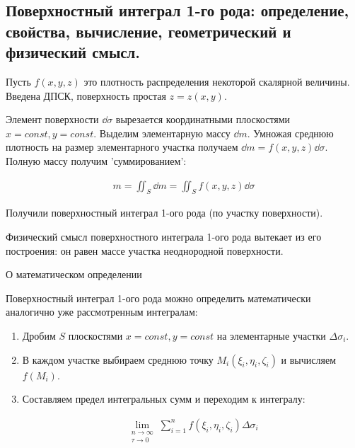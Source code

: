 \subsection{%
  Поверхностный интеграл 1-го рода: определение, свойства, вычисление,
  геометрический и физический смысл.%
}

\begin{twocolumns}
  
  \columnbreak

  Пусть \(f(x, y, z)\) это плотность распределения некоторой скалярной величины.
  Введена ДПСК, поверхность простая \(z = z(x, y)\).

  Элемент поверхности \(\dd \sigma\) вырезается координатными плоскостями
  \(x = const, y = const\). Выделим элементарную массу \(\dd  m\). Умножая
  среднюю плотность на размер элементарного участка получаем
  \(\dd m = f(x, y, z) \dd \sigma\). Полную массу получим 'суммированием':

  \begin{align*}
    m = \iint_{S} \dd m = \iint_{S} f(x, y, z) \dd \sigma
  \end{align*}

  Получили поверхностный интеграл 1-ого рода (по участку поверхности).
\end{twocolumns}

\begin{remark}
  Физический смысл поверхностного интеграла 1-ого рода вытекает из его
  построения: он равен массе участка неоднородной поверхности.
\end{remark}

\begin{remark}
  О математическом определении

  Поверхностный интеграл 1-ого рода можно определить математически аналогично
  уже рассмотренным интегралам:

  \begin{enumerate}
    \item Дробим \(S\) плоскостями \(x = const, y = const\) на элементарные
    участки \(\Delta \sigma_{i}\).

    \item В каждом участке выбираем среднюю точку
    \(M_{i}(\xi_{i}, \eta_{i}, \zeta_{i})\) и вычисляем \(f(M_{i})\).

    \item Составляем предел интегральных сумм и переходим к интегралу:

    \begin{align*}
      \lim_{\substack{n \to \infty \\ \tau \to 0}}
        \sum_{i = 1}^{n} f(\xi_{i}, \eta_{i}, \zeta_{i}) \Delta \sigma_{i}
    \end{align*}
  \end{enumerate}
\end{remark}

